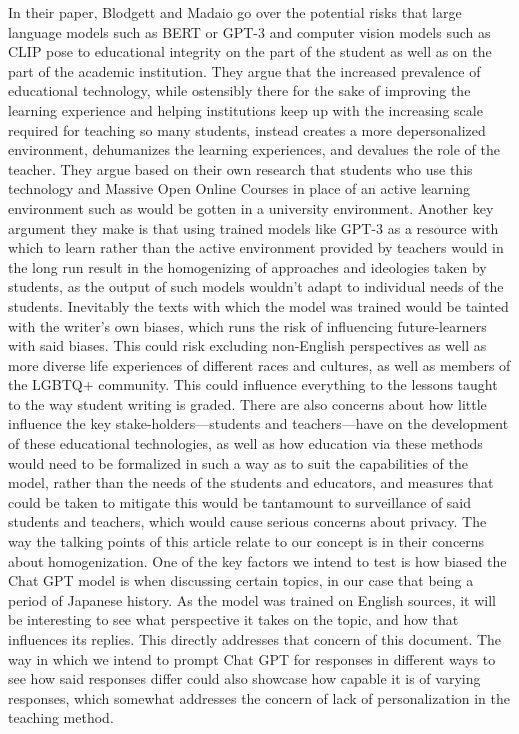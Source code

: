 \documentclass[letterpaper, 10 pt, conference]{ieeeconf}  %
\begin{document}
In their paper, Blodgett and Madaio go over the potential risks that large language models such as BERT or GPT-3 and
computer vision models such as CLIP pose to educational integrity on the part of the student as well as on the part of the academic
institution. They argue that the increased prevalence of educational technology, while ostensibly there for the sake of improving
the learning experience and helping institutions keep up with the increasing scale required for teaching so many students, instead
creates a more depersonalized environment, dehumanizes the learning experiences, and devalues the role of the teacher. They argue
based on their own research that students who use this technology and Massive Open Online Courses in place of an active learning
environment such as would be gotten in a university environment.
Another key argument they make is that using trained models like GPT-3 as a resource with which to learn rather than
the active environment provided by teachers would in the long run result in the homogenizing of approaches and ideologies taken
by students, as the output of such models wouldn’t adapt to individual needs of the students. Inevitably the texts with which the
model was trained would be tainted with the writer’s own biases, which runs the risk of influencing future-learners with said biases.
This could risk excluding non-English perspectives as well as more diverse life experiences of different races and cultures, as well
as members of the LGBTQ+ community. This could influence everything to the lessons taught to the way student writing is graded.
There are also concerns about how little influence the key stake-holders—students and teachers—have on the
development of these educational technologies, as well as how education via these methods would need to be formalized in such a
way as to suit the capabilities of the model, rather than the needs of the students and educators, and measures that could be taken
to mitigate this would be tantamount to surveillance of said students and teachers, which would cause serious concerns about
privacy.
The way the talking points of this article relate to our concept is in their concerns about homogenization. One of the key
factors we intend to test is how biased the Chat GPT model is when discussing certain topics, in our case that being a period of
Japanese history. As the model was trained on English sources, it will be interesting to see what perspective it takes on the topic,
and how that influences its replies. This directly addresses that concern of this document. The way in which we intend to prompt
Chat GPT for responses in different ways to see how said responses differ could also showcase how capable it is of varying
responses, which somewhat addresses the concern of lack of personalization in the teaching method.
\end{document}
